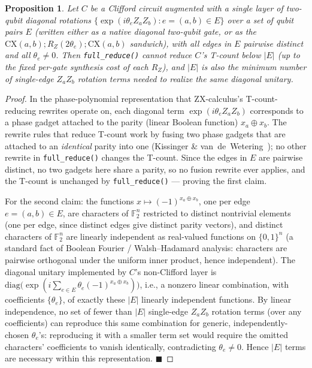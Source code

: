 \documentclass[9pt,twocolumn]{extarticle}
\newtheorem{proposition}{Proposition}
\begin{document}
\begin{proposition}
Let $C$ be a Clifford circuit augmented with a single layer of two-qubit
diagonal rotations $\{\exp(i\theta_e Z_aZ_b) : e=(a,b)\in E\}$ over a set
of qubit pairs $E$ (written either as a native diagonal two-qubit gate, or
as the $\mathrm{CX}(a,b);R_Z(2\theta_e);\mathrm{CX}(a,b)$ sandwich),
with all edges in $E$ pairwise distinct and all $\theta_e \neq 0$. Then
\texttt{full\_reduce()} cannot reduce $C$'s T-count below $|E|$
(up to the fixed per-gate synthesis cost of each $R_Z$), and $|E|$ is also
the minimum number of single-edge $Z_aZ_b$ rotation terms needed to realize
the same diagonal unitary.
\end{proposition}

\begin{proof}
In the phase-polynomial representation that ZX-calculus's T-count-reducing
rewrites operate on, each diagonal term $\exp(i\theta_e Z_aZ_b)$
corresponds to a phase gadget attached to the parity (linear Boolean
function) $x_a \oplus x_b$. The rewrite rules that reduce T-count work by
fusing two phase gadgets that are attached to an \emph{identical} parity
into one (Kissinger \& van~de~Wetering~\cite{kissinger2019}); no other
rewrite in \texttt{full\_reduce()} changes the T-count. Since the edges in
$E$ are pairwise distinct, no two gadgets here share a parity, so no
fusion rewrite ever applies, and the T-count is unchanged by
\texttt{full\_reduce()} --- proving the first claim.

For the second claim: the functions $x \mapsto (-1)^{x_a \oplus x_b}$, one
per edge $e=(a,b)\in E$, are characters of $\mathbb{F}_2^n$ restricted to
distinct nontrivial elements (one per edge, since distinct edges give
distinct parity vectors), and distinct characters of $\mathbb{F}_2^n$ are
linearly independent as real-valued functions on $\{0,1\}^n$ (a standard
fact of Boolean Fourier / Walsh--Hadamard analysis: characters are
pairwise orthogonal under the uniform inner product, hence independent).
The diagonal unitary implemented by $C$'s non-Clifford layer is
$\mathrm{diag}\!\big(\exp(i\sum_{e\in E}\theta_e(-1)^{x_a\oplus x_b})\big)$,
i.e., a nonzero linear combination, with coefficients $\{\theta_e\}$, of
exactly these $|E|$ linearly independent functions. By linear
independence, no set of fewer than $|E|$ single-edge $Z_aZ_b$ rotation
terms (over any coefficients) can reproduce this same combination for
generic, independently-chosen $\theta_e$'s: reproducing it with a smaller
term set would require the omitted characters' coefficients to vanish
identically, contradicting $\theta_e \neq 0$. Hence $|E|$ terms are
necessary within this representation. $\blacksquare$
\end{proof}
\end{document}
